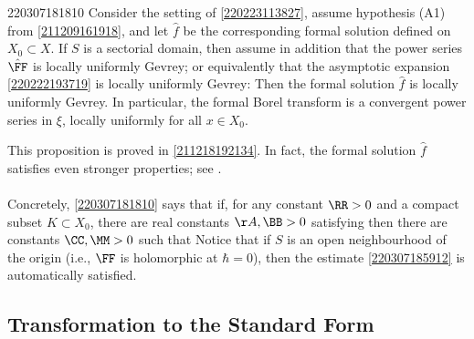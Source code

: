 \documentclass[11pt]{article}
\begin{document}
\begin{prop}{220307181810}
Consider the setting of \autoref{220223113827}, assume hypothesis \textup{(A1)} from \autoref{211209161918}, and let $\hat{f}$ be the corresponding formal solution defined on $X_0 \subset X$.
If $S$ is a sectorial domain, then assume in addition that the power series $\hat{\FF}$ is locally uniformly Gevrey; or equivalently that the asymptotic expansion \eqref{220222193719} is locally uniformly Gevrey:
Then the formal solution $\hat{f}$ is locally uniformly Gevrey.
In particular, the formal Borel transform 
is a convergent power series in $\xi$, locally uniformly for all $x \in X_0$.
\end{prop}

This proposition is proved in \autoref{211218192134}.
In fact, the formal solution $\hat{f}$ satisfies even stronger properties; see .

\paragraph{}
Concretely, \autoref{220307181810} says that if, for any constant $\RR > 0$ and a compact subset $K \subset X_0$, there are real constants $\AA, \BB > 0$ satisfying 
then there are constants $\CC, \MM > 0$ such that
Notice that if $S$ is an open neighbourhood of the origin (i.e., $\FF$ is holomorphic at $\hbar = 0$), then the estimate \eqref{220307185912} is automatically satisfied.

\subsection{Transformation to the Standard Form}
\end{document}
